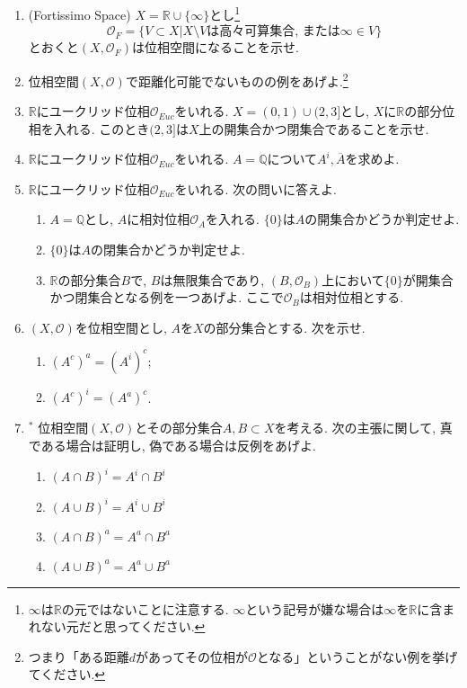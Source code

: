 \documentclass[dvipdfmx,a4paper,11pt]{article}
\newcommand{\R}{\mathbb{R}}
\newcommand{\Q}{\mathbb{Q}}
\theoremstyle{definition}
\begin{document}
\begin{enumerate}[ label=\textbf{問}2.\arabic*]
\item (Fortissimo Space) $X = \R \cup \{ \infty \}$とし\footnote{$\infty$は$\R$の元ではないことに注意する. $\infty$という記号が嫌な場合は$\infty$を$\R$に含まれない元だと思ってください.}
$$
\mathscr{O}_{F}= \{ V \subset X | \text{$X \setminus V$は高々可算集合, または$\infty \in V$}\}
$$
とおくと$(X, \mathscr{O}_{F})$は位相空間になることを示せ.

\item 位相空間$(X, \mathscr{O})$で距離化可能でないものの例をあげよ.\footnote{つまり「ある距離$d$があってその位相が$\mathscr{O}$となる」ということがない例を挙げてください.}


\item $\R$にユークリッド位相$\mathscr{O}_{Euc}$をいれる. $X = (0,1) \cup (2,3]$とし, $X$に$\R$の部分位相を入れる. このとき$(2,3]$は$X$上の開集合かつ閉集合であることを示せ. 

\item $\R$にユークリッド位相$\mathscr{O}_{Euc}$をいれる. $A=\Q$について$A^{i},\overline{A}$を求めよ.

\item $\R$にユークリッド位相$\mathscr{O}_{Euc}$をいれる. 次の問いに答えよ.
	\begin{enumerate}
	\item $A=\Q$とし, $A$に相対位相$\mathscr{O}_{A}$を入れる. $\{ 0\}$は$A$の開集合かどうか判定せよ. 
	\item $\{ 0\}$は$A$の閉集合かどうか判定せよ.
	\item $\R$の部分集合$B$で, $B$は無限集合であり, $(B, \mathscr{O}_{B})$上において$\{ 0\}$が開集合かつ閉集合となる例を一つあげよ. ここで$\mathscr{O}_{B}$は相対位相とする.
	\end{enumerate}
	
\item $(X, \mathscr{O})$を位相空間とし, $A$を$X$の部分集合とする. 次を示せ. 
	\begin{enumerate}
	\item $(A^c)^a = (A^i)^c$;
	\item $(A^c)^i = (A^a)^c$.
	\end{enumerate}




\item $^{*}$ 位相空間$(X, \mathscr{O})$とその部分集合$A,B \subset X$を考える. 次の主張に関して, 真である場合は証明し, 偽である場合は反例をあげよ.
	\begin{enumerate}
	\item $(A \cap B)^i = A^i \cap B^i$
	\item $(A \cup B)^i = A^i \cup B^i$
	\item $(A \cap B)^a= A^a\cap B^a$
	\item $(A \cup B)^a = A^a\cup B^a$
	\end{enumerate}


\end{enumerate}
\end{document}
